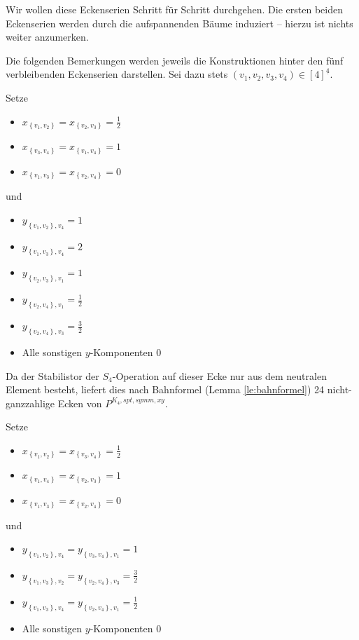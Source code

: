 \documentclass[10p,a4paper,BCOR = 12mm, DIV=15]{scrbook}
\begin{document}
{Wir wollen diese Eckenserien Schritt für Schritt durchgehen. Die ersten beiden Eckenserien werden durch die aufspannenden Bäume induziert -- hierzu ist nichts weiter anzumerken.

Die folgenden Bemerkungen werden jeweils die Konstruktionen hinter den fünf verbleibenden Eckenserien darstellen. Sei dazu stets $\left(v_1, v_2, v_3, v_4\right) \in \left[4\right]^{\underline{4}}$.

\begin{Bem}
Setze
\begin{itemize}
\item $x_{\left\{v_1, v_2\right\}} = x_{\left\{v_2, v_3\right\}} = \frac{1}{2}$
\item $x_{\left\{v_3, v_4\right\}} = x_{\left\{v_1, v_4\right\}} = 1$
\item $x_{\left\{v_1, v_3\right\}} = x_{\left\{v_2, v_4\right\}} = 0$
\end{itemize}
und
\begin{itemize}
\item $y_{\left\{v_1, v_2\right\}, v_4} = 1$
\item $y_{\left\{v_1, v_3\right\}, v_4} = 2$
\item $y_{\left\{v_2, v_3\right\}, v_1} = 1$
\item $y_{\left\{v_2, v_4\right\}, v_1} = \frac{1}{2}$
\item $y_{\left\{v_2, v_4\right\}, v_3} = \frac{3}{2}$
\item Alle sonstigen $y$-Komponenten $0$
\end{itemize}

Da der Stabilistor der $S_4$-Operation auf dieser Ecke nur aus dem neutralen Element besteht, liefert dies nach Bahnformel (Lemma \ref{le:bahnformel}) 24 nicht-ganzzahlige Ecken von $P^{K_4, spt, symm, xy}$.
\end{Bem}

\begin{Bem}
Setze
\begin{itemize}
\item $x_{\left\{v_1, v_2\right\}} = x_{\left\{v_3, v_4\right\}} = \frac{1}{2}$
\item $x_{\left\{v_1, v_4\right\}} = x_{\left\{v_2, v_3\right\}} = 1$
\item $x_{\left\{v_1, v_3\right\}} = x_{\left\{v_2, v_4\right\}} = 0$
\end{itemize}
und
\begin{itemize}
\item $y_{\left\{v_1, v_2\right\}, v_4} = y_{\left\{v_3, v_4\right\}, v_1} = 1$
\item $y_{\left\{v_1, v_3\right\}, v_2} = y_{\left\{v_2, v_4\right\}, v_3} = \frac{3}{2}$
\item $y_{\left\{v_1, v_3\right\}, v_4} = y_{\left\{v_2, v_4\right\}, v_1} = \frac{1}{2}$
\item Alle sonstigen $y$-Komponenten $0$
\end{itemize}


\end{Bem}}
\end{document}
